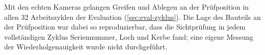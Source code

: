 Mit den echten Kameras gelangen Greifen und Ablegen an der Prüfposition in allen 32
Arbeitszyklen der Evaluation (\cref{sec:eval-zyklus}). Die Lage des Bauteils an der Prüfposition
war dabei so reproduzierbar, dass die Sichtprüfung in jedem vollständigen Zyklus Seriennummer,
Loch und Kerbe fand; eine eigene Messung der Wiederholgenauigkeit wurde nicht durchgeführt.
